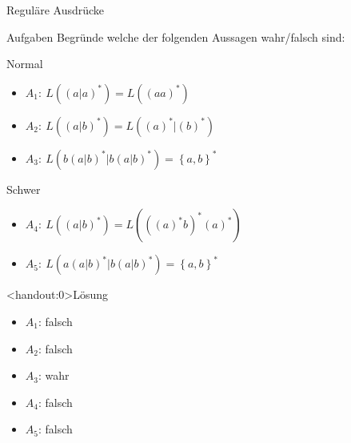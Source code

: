 {
\begin{frame}{Reguläre Ausdrücke}
    \begin{alertblock}{Aufgaben}
        Begründe welche der folgenden Aussagen wahr/falsch sind:
    \end{alertblock}
    \begin{block}{Normal}
        \begin{itemize}
            \item $A_1:\ L\left(\left(a|a\right)^*\right) = L\left(\left(aa\right)^*\right)$
            \item $A_2:\ L\left(\left(a|b\right)^*\right) = L\left(\left(a\right)^*|\left(b\right)^*\right)$
            \item $A_3:\
            L\left(b\left(a|b\right)^*|b\left(a|b\right)^*\right) = \left\{a,b\right\}^*$
        \end{itemize}
    \end{block}
    \begin{block}{Schwer}
        \begin{itemize}
            \item $A_4:\            
            L\left(\left(a|b\right)^*\right) = L\left(\left(\left(a\right)^*b\right)^*\left(a\right)^*\right)$
            \item $A_5:\ L\left(a\left(a|b\right)^*|b\left(a|b\right)^*\right) = \left\{a,b\right\}^*$
        \end{itemize}
    \end{block}
\end{frame}
}

{
\begin{frame}<handout:0>{Lösung}
    \begin{itemize}[<+- | alert@+>]
        \item $A_1$: falsch
        \item $A_2$: falsch
        \item $A_3$: wahr
        \item $A_4$: falsch
        \item $A_5$: falsch
    \end{itemize}
\end{frame}
}

%
%

